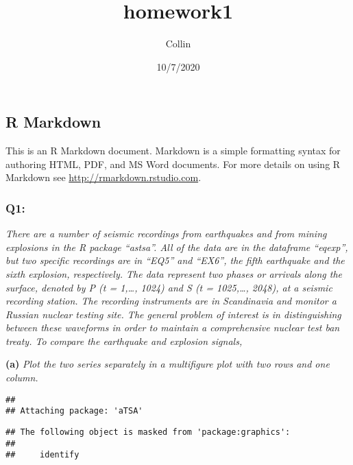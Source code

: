 \documentclass[]{article}
\title{homework1}
\author{Collin}
\date{10/7/2020}
\begin{document}
\maketitle

\hypertarget{r-markdown}{%
\subsection{R Markdown}\label{r-markdown}}

This is an R Markdown document. Markdown is a simple formatting syntax
for authoring HTML, PDF, and MS Word documents. For more details on
using R Markdown see \url{http://rmarkdown.rstudio.com}.

\hypertarget{q1}{%
\subsubsection{Q1:}\label{q1}}

\emph{There are a number of seismic recordings from earthquakes and from
mining explosions in the R package ``astsa''. All of the data are in the
dataframe ``eqexp'', but two specific recordings are in ``EQ5'' and
``EX6'', the fifth earthquake and the sixth explosion, respectively. The
data represent two phases or arrivals along the surface, denoted by P (t
= 1,\ldots{}, 1024) and S (t = 1025,\ldots{}, 2048), at a seismic
recording station. The recording instruments are in Scandinavia and
monitor a Russian nuclear testing site. The general problem of interest
is in distinguishing between these waveforms in order to maintain a
comprehensive nuclear test ban treaty. To compare the earthquake and
explosion signals,}

\textbf{(a)} \emph{Plot the two series separately in a multifigure plot
with two rows and one column.}

\begin{verbatim}
## 
## Attaching package: 'aTSA'
\end{verbatim}

\begin{verbatim}
## The following object is masked from 'package:graphics':
## 
##     identify
\end{verbatim}
\end{document}
